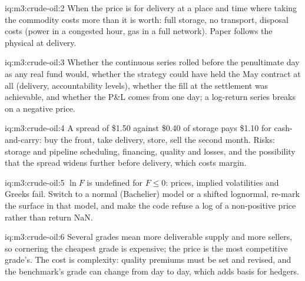 \begin{solution}{iq:m3:crude-oil:2}
When the price is for delivery at a place and time where taking the commodity costs
more than it is worth: full storage, no transport, disposal costs (power in a
congested hour, gas in a full network). Paper follows the physical at delivery.
\end{solution}

\begin{solution}{iq:m3:crude-oil:3}
Whether the continuous series rolled before the penultimate day as any real fund
would, whether the strategy could have held the May contract at all (delivery,
accountability levels), whether the fill at the settlement was achievable, and
whether the P\&L comes from one day; a log-return series breaks on a negative price.
\end{solution}

\begin{solution}{iq:m3:crude-oil:4}
A spread of \$1.50 against \$0.40 of storage pays \$1.10 for cash-and-carry: buy
the front, take delivery, store, sell the second month. Risks: storage and pipeline
scheduling, financing, quality and losses, and the possibility that the spread widens
further before delivery, which costs margin.
\end{solution}

\begin{solution}{iq:m3:crude-oil:5}
$\ln F$ is undefined for $F \le 0$: prices, implied volatilities and Greeks fail.
Switch to a normal (Bachelier) model or a shifted lognormal, re-mark the surface in
that model, and make the code refuse a log of a non-positive price rather than return
NaN.
\end{solution}

\begin{solution}{iq:m3:crude-oil:6}
Several grades mean more deliverable supply and more sellers, so cornering the
cheapest grade is expensive; the price is the most competitive grade's. The cost is
complexity: quality premiums must be set and revised, and the benchmark's grade can
change from day to day, which adds basis for hedgers.
\end{solution}
